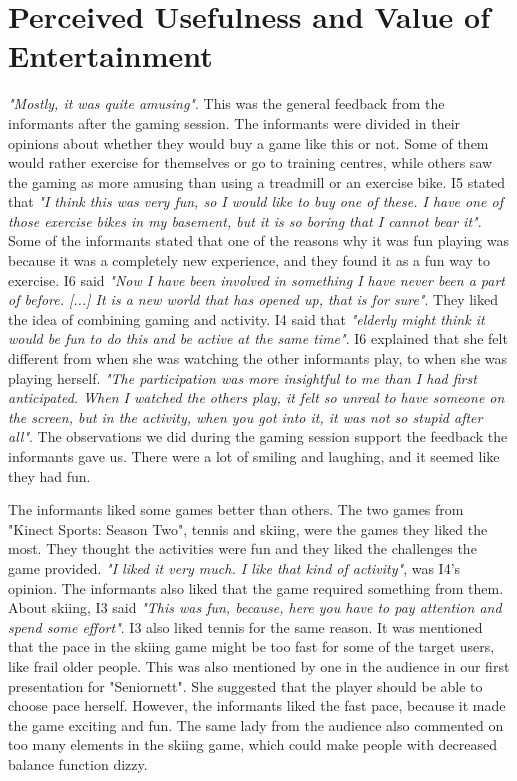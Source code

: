 \section{Perceived Usefulness and Value of Entertainment}
\emph{"Mostly, it was quite amusing"}. This was the general feedback from the informants after the gaming session. The informants were divided in their opinions about whether they would buy a game like this or not. Some of them would rather exercise for themselves or go to training centres, while others saw the gaming as more amusing than using a treadmill or an exercise bike. I5 stated that \emph{"I think this was very fun, so I would like to buy one of these. I have one of those exercise bikes in my basement, but it is so boring that I cannot bear it"}.  Some of the informants stated that one of the reasons why it was fun playing was because it was a completely new experience, and they found it as a fun way to exercise. I6 said \emph{"Now I have been involved in something I have never been a part of before. [...] It is a new world that has opened up, that is for sure"}.  They liked the idea of combining gaming and activity. I4 said that \emph{"elderly might think it would be fun to do this and be active at the same time"}. I6 explained that she felt different from when she was watching the other informants play, to when she was playing herself. \emph{"The participation was more insightful to me than I had first anticipated. When I watched the others play, it felt so unreal to have someone on the screen, but in the activity, when you got into it, it was not so stupid after all"}. The observations we did during the gaming session support the feedback the informants gave us. There were a lot of smiling and laughing, and it seemed like they had fun.  

The informants liked some games better than others. The two games from "Kinect Sports: Season Two", tennis and skiing, were the games they liked the most. They thought the activities were fun and they liked the challenges the game provided. \emph{"I liked it very much. I like that kind of activity"}, was I4's opinion. The informants also liked that the game required something from them. About skiing, I3 said \emph{"This was fun, because, here you have to pay attention and spend some effort"}. I3 also liked tennis for the same reason. It was mentioned that the pace in the skiing game might be too fast for some of the target users, like frail older people. This was also mentioned by one in the audience in our first presentation for "Seniornett". She suggested that the player should be able to choose pace herself. However, the informants liked the fast pace, because it made the game exciting and fun. The same lady from the audience also commented on too many elements in the skiing game, which could make people with decreased balance function dizzy. 

